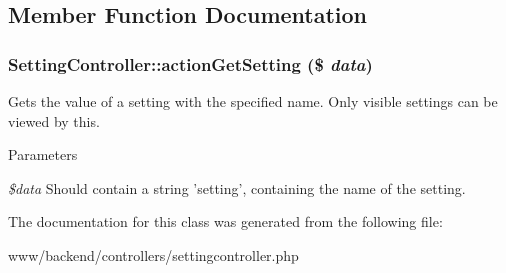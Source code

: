\subsection{Member Function Documentation}
\hypertarget{classSettingController_aa1a19cc6fa6b666b11e62bc8bf4301c7}{
\subsubsection[{actionGetSetting}]{\setlength{\rightskip}{0pt plus 5cm}SettingController::actionGetSetting (\$ {\em data})}}
\label{classSettingController_aa1a19cc6fa6b666b11e62bc8bf4301c7}
Gets the value of a setting with the specified name. Only visible settings can be viewed by this.


\begin{DoxyParams}{Parameters}
\item[{\em \$data}]Should contain a string 'setting', containing the name of the setting. \end{DoxyParams}


The documentation for this class was generated from the following file:\begin{DoxyCompactItemize}
\item 
www/backend/controllers/settingcontroller.php\end{DoxyCompactItemize}

